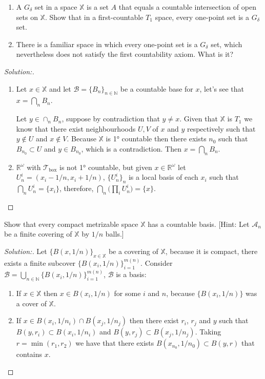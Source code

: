 \documentclass[a4paper,12pt, reqno]{article}
\theoremstyle{definition}
\newenvironment{exerr}[1]{
  \renewcommand\theexeralt{#1}
  \exeralt
}{\endexeralt}
\newenvironment{solution}{\begin{proof}[Solution:]}{\end{proof}}
\newcommand{\R}{\mathbb{R}}
\newcommand{\T}{\mathscr{T}}
\newcommand{\A}{\mathscr{A}}
\newcommand{\B}{\mathscr{B}}
\newcommand{\N}{\mathbb{N}}
\newcommand{\X}{\mathbb{X}}
\begin{document}
\begin{exerr}{1}\hfill
  \begin{enumerate}[label=(\alph*)]
    \item A $G_{\delta}$ set in a space $\X$ is a set $A$ that equals a countable intersection of open sets on $\X$. Show that in a first-countable $T_{1}$ space, every one-point set is a $G_{\delta}$ set.
    \item There is a familiar space in which every one-point set is a $G_{\delta}$ set, which nevertheless does not satisfy the first countability axiom. What is it?
  \end{enumerate}
\end{exerr}
\begin{solution}\hfill
  \begin{enumerate}[label=(\alph*)]
    \item Let $x\in\X$ and let $\B = \{ B_{n} \}_{n\in\N}$ be a countable base for $x$, let's see that $x = \bigcap_{n}B_{n}$.
    
    Let $y\in\cap_{n}B_{n}$, suppose by contradiction that $y\neq x$. Given that $\X$ is $T_{1}$ we know that there exist neighbourhoods $U,V$ of $x$ and $y$ respectively such that $y\notin U$ and $x\notin V$. Because $\X$ is 1° countable then there exists $n_{0}$ such that $B_{n_{0}}\subset U$ and $y\in B_{n_{0}}$, which is a contradiction. Then $x = \bigcap_{n}B_{n}$.
    \item $\R^\omega$ with $\T_{\text{box}}$ is not 1° countable, but given $x\in\R^\omega$ let $U_{n}^i = (x_{i}-1/n, x_{i}+1/n)$, $\{ U_{n}^i \}_{n}$ is a local basis of each $x_{i}$ such that $\bigcap_{n}U_{n}^i = \{ x_{i} \}$, therefore, $\bigcap_{n}\big( \prod_{i}U_{n}^i \big) = \{ x \}$.
   \end{enumerate}
\end{solution}

\begin{exerr}{4}
  Show that every compact metrizable space $\X$ has a countable basis. [Hint: Let $\A_{n}$ be a finite covering of $\X$ by $1/n$ balls.]
\end{exerr}
\begin{solution}
  Let $\{ B(x,1/n) \}_{x\in\X}$ be a covering of $\X$, because it is compact, there exists a finite subcover $\{ B(x_{i},1/n) \}_{i=1}^{m(n)}$. Consider $\B = \bigcup_{n\in\N}\{ B(x_{i},1/n) \}_{i=1}^{m(n)}$, $\B$ is a basis:
  \begin{enumerate}
    \item If $x\in\X$ then $x\in B(x_{i},1/n)$ for some $i$ and $n$, because $\{ B(x_{i},1/n) \}$ was a cover of $\X$.
    \item If $x\in B(x_{i},1/n_{i})\cap B(x_{j},1/n_{j})$ then there exist $r_{i}$, $r_{j}$ and $y$ such that $B(y,r_{i})\subset B(x_{i},1/n_{i})$ and $B(y,r_{j})\subset B(x_{j},1/n_{j})$. Taking $r = \min(r_{1},r_{2})$ we have that there exists $B(x_{n_{0}},1/n_{0}) \subset B(y,r)$ that contains $x$.
  \end{enumerate}
\end{solution}
\end{document}

